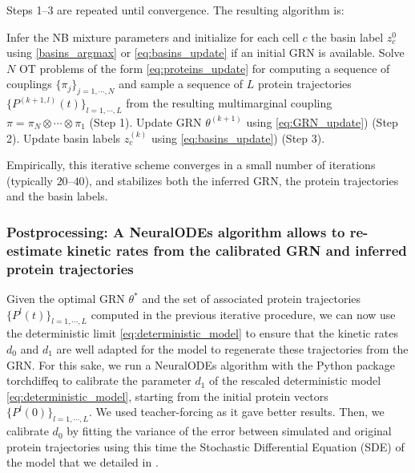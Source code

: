 
Steps 1--3 are repeated until convergence. 
The resulting algorithm is:

\begin{algorithm}[H]
\caption{CardamomOT}
\begin{algorithmic}[1]
\State Infer the NB mixture parameters and initialize for each cell $c$ the basin label $z_c^0$ using \eqref{basins_argmax} or \eqref{eq:basins_update} if an initial GRN is available.
  \State Solve $N$ OT problems of the form \eqref{eq:proteins_update} for computing a sequence of couplings $\{\pi_j\}_{j=1,\cdots,N}$ and sample a sequence of $L$ protein trajectories $\{P^{(k+1, l)}(t)\}_{l=1,\cdots,L}$ from the resulting multimarginal coupling $\pi = \pi_N \otimes \cdots \otimes \pi_1$ (Step 1).
  \State Update GRN $\theta^{(k+1)}$ using \eqref{eq:GRN_update}) (Step 2).
  \State Update basin labels $z_c^{(k)}$ using \eqref{eq:basins_update}) (Step 3).
\EndFor
\end{algorithmic}
\end{algorithm}

Empirically, this iterative scheme converges in a small number of iterations
(typically $20$--$40$), and stabilizes both the inferred GRN, the protein
trajectories and the basin labels.


\subsubsection{Postprocessing: A NeuralODEs algorithm allows to re-estimate kinetic rates from the calibrated GRN and inferred protein trajectories}

Given the optimal GRN $\theta^*$ and the set of associated protein trajectories $\{P^{l}(t)\}_{l=1,\cdots,L}$ computed in the previous iterative procedure, we can now use the deterministic limit \eqref{eq:deterministic_model} to ensure that the kinetic rates $d_0$ and $d_1$ are well adapted for the model to regenerate these trajectories from the GRN. For this sake, we run a NeuralODEs algorithm with the Python package \textrm{torchdiffeq} to calibrate the parameter $d_1$ of the rescaled deterministic model \eqref{eq:deterministic_model}, starting from the initial protein vectors $\{P^{l}(0)\}_{l=1,\cdots,L}$. We used teacher-forcing \cite{yeo2021generative} as it gave better results. Then, we calibrate $d_0$ by fitting the variance of the error between simulated and original protein trajectories using this time the Stochastic Differential Equation (SDE) of the model that we detailed in \cite{ventre2020reduction}.\\


